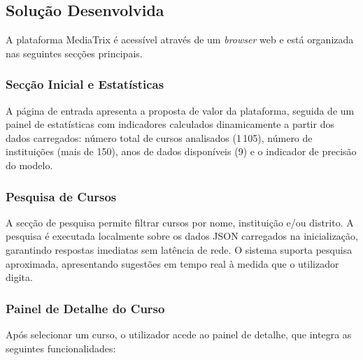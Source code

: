 \documentclass[12pt,a4paper]{article}
\begin{document}
\subsection{Solução Desenvolvida}

A plataforma MediaTrix é acessível através de um \textit{browser} web e está organizada nas seguintes secções principais.

\subsubsection{Secção Inicial e Estatísticas}

A página de entrada apresenta a proposta de valor da plataforma, seguida de um painel de estatísticas com indicadores calculados dinamicamente a partir dos dados carregados: número total de cursos analisados (1\,105), número de instituições (mais de 150), anos de dados disponíveis (9) e o indicador de precisão do modelo.

\subsubsection{Pesquisa de Cursos}

A secção de pesquisa permite filtrar cursos por nome, instituição e/ou distrito. A pesquisa é executada localmente sobre os dados JSON carregados na inicialização, garantindo respostas imediatas sem latência de rede. O sistema suporta pesquisa aproximada, apresentando sugestões em tempo real à medida que o utilizador digita.

\subsubsection{Painel de Detalhe do Curso}

Após selecionar um curso, o utilizador acede ao painel de detalhe, que integra as seguintes funcionalidades:
\end{document}

